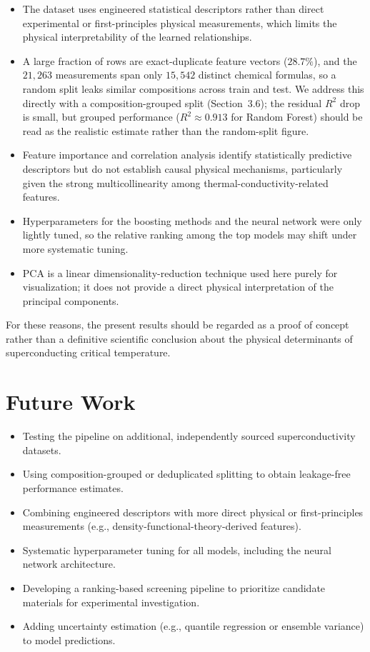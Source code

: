 \documentclass[11pt]{article}
\begin{document}
\begin{itemize}
  \item The dataset uses engineered statistical descriptors rather than direct experimental or
        first-principles physical measurements, which limits the physical interpretability of the learned
        relationships.
  \item A large fraction of rows are exact-duplicate feature vectors ($28.7\%$), and the $21{,}263$
        measurements span only $15{,}542$ distinct chemical formulas, so a random split leaks similar
        compositions across train and test. We address this directly with a composition-grouped split
        (Section~3.6); the residual $R^2$ drop is small, but grouped performance ($R^2 \approx 0.913$ for
        Random Forest) should be read as the realistic estimate rather than the random-split figure.
  \item Feature importance and correlation analysis identify statistically predictive descriptors but do
        not establish causal physical mechanisms, particularly given the strong multicollinearity among
        thermal-conductivity-related features.
  \item Hyperparameters for the boosting methods and the neural network were only lightly tuned, so the
        relative ranking among the top models may shift under more systematic tuning.
  \item PCA is a linear dimensionality-reduction technique used here purely for visualization; it does not
        provide a direct physical interpretation of the principal components.
\end{itemize}

For these reasons, the present results should be regarded as a proof of concept rather than a definitive
scientific conclusion about the physical determinants of superconducting critical temperature.

\section{Future Work}
\begin{itemize}
  \item Testing the pipeline on additional, independently sourced superconductivity datasets.
  \item Using composition-grouped or deduplicated splitting to obtain leakage-free performance estimates.
  \item Combining engineered descriptors with more direct physical or first-principles measurements
        (e.g., density-functional-theory-derived features).
  \item Systematic hyperparameter tuning for all models, including the neural network architecture.
  \item Developing a ranking-based screening pipeline to prioritize candidate materials for experimental
        investigation.
  \item Adding uncertainty estimation (e.g., quantile regression or ensemble variance) to model
        predictions.
\end{itemize}
\end{document}

